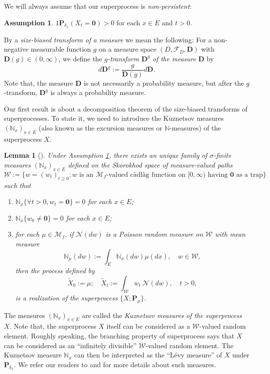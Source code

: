 \documentclass[UTF8]{pkuthss}
\theoremstyle{plain}
\newtheorem{lem}[thm]{Lemma}
\theoremstyle{definition}
\newtheorem{asp}{Assumption}[chapter]
\numberwithin{equation}{section}
\begin{document}
	We will always assume that our superprocess is \emph{non-persistent}:
\begin{asp}{$1$}\label{asp:1}
	$\mathbf P_{\delta_x}(X_t = \mathbf 0) > 0$ for each $x \in E$ and $t>0$.
\end{asp}
	By a \emph{size-biased transform of a measure} we mean the following:
	For a non-negative measurable function $g$ on a measure space $(D,\mathscr F_D,\mathbf D)$ with $\mathbf D(g)\in (0,\infty)$, we define  the \emph{$g$-transform $\mathbf D^g$ of the measure $\mathbf D$} by
\[
	d\mathbf D^g
	:= \frac{g}{\mathbf D(g)} d\mathbf D.
\]
	Note that, the measure $\mathbf D$ is not necessarily a probability measure, but after the $g$-transform, $\mathbf D^g$ is always a probability measure.
	
	Our first result is about a decomposition theorem of the size-biased transforms of superprocesses.
	To state it, we need to introduce the Kuznetsov measures $(\mathbb N_x)_{x\in E}$ (also known as the excursion measures or $\mathbb N$-measures) of the superprocess $X$.
\begin{lem}[{\cite[Section 8.4 \& Theorem 8.24]{Li2011Measure-valued}}]
\label{lem: Kuznetsov measures}
	Under Assumption \ref{asp:1}, there exists an unique family of $\sigma$-finite measures $(\mathbb N_x)_{x\in E}$ defined on the Skorokhod space of measure-valued paths
\[
  \mathcal W :=\{ w= (w_t)_{t\geq 0}: w \text{ is an $\mathcal M_f$-valued c\`{a}dl\`{a}g function on $[0,\infty)$ having $\mathbf 0$ as a trap}\}
\]
	such that
\begin{enumerate}
\item
    $\mathbb N_x \{\forall t > 0, w_t=\mathbf 0\} =0$ for each $x\in E$;
\item
    $\mathbb N_x\{w_0 \neq \mathbf 0\} = 0$ for each $x\in E$;
\item
    for each $\mu \in \mathcal M_f$, if $\mathcal N(dw)$ is a Poisson random measure on $\mathcal W$ with mean measure
\[
  \mathbb N_\mu(dw):= \int_E \mathbb N_x(dw)\mu(dx), \quad w\in \mathcal W,
\]
  then the process defined by
\[
	\widetilde X_0 := \mu;
	\quad \widetilde X_t
	:=\int_{\mathcal W}w_t~\mathcal N(dw),
	\quad t>0,
\]
	is a realization of the superprocess $\{X; \mathbf P_{\mu}\}$.
\end{enumerate}
\end{lem}
The measures $(\mathbb N_x)_{x\in E}$ are called the \emph{Kuznetsov measures of the superprocess $X$}.
		Note that, the superprocess $X$ itself can be considered as a $\mathcal W$-valued random element.
    Roughly speaking, the branching property of superprocess  says that $X$ can be considered as an ``infinitely divisible'' $\mathcal W$-valued random element.
		The Kuznetsov measure $\mathbb N_x$ can then be interpreted as the ``L\'{e}vy measure'' of $X$ under $\mathbf P_{\delta_x}$.
	We refer our readers to \cite{DynkinKuznetsov2004N-measure} and \cite[Section 8.4]{Li2011Measure-valued} for more details about such measures.
\end{document}
